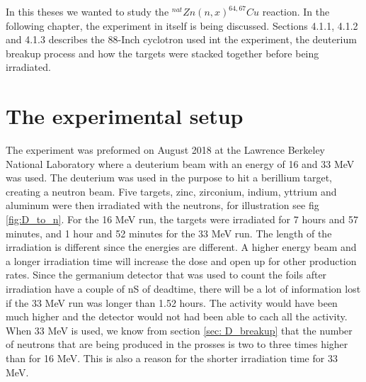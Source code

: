\documentclass[twoside,english]{uiofysmaster/uiofysmaster}
\begin{document}
In this theses we wanted to study the $^{nat}Zn(n,x)^{64,67}Cu$ reaction. 
In the following chapter, the experiment in itself is being discussed. Sections 4.1.1, 4.1.2 and 4.1.3 describes the 88-Inch cyclotron used int the experiment, the deuterium breakup process and how the targets were stacked together before being irradiated.


\section{The experimental setup}
\label{sec: setup}

The experiment was preformed on August 2018 at the Lawrence Berkeley National Laboratory where a deuterium beam with an energy of 16 and 33 MeV was used. The deuterium was used in the purpose to hit a berillium target, creating a neutron beam. Five targets, zinc, zirconium, indium, yttrium and aluminum were then irradiated with the neutrons, for illustration see fig \ref{fig:D_to_n}. For the 16 MeV run, the targets were irradiated for 7 hours and 57 minutes, and 1 hour and 52 minutes for the 33 MeV run. The length of the irradiation is different since the energies are different. A higher energy beam and a longer irradiation time will increase the dose and open up for other production rates. Since the germanium detector that was used to count the foils after irradiation have a couple of nS of deadtime, there will be a lot of information lost if the 33 MeV run was longer than 1.52 hours. The activity would have been much higher and the detector would not had been able to cach all the activity.\\ When 33 MeV is used, we know from section \ref{sec: D_breakup} that the number of neutrons that are being produced in the prosses is two to three times higher than for 16 MeV. This is also a reason for the shorter irradiation time for 33 MeV.
\end{document}
